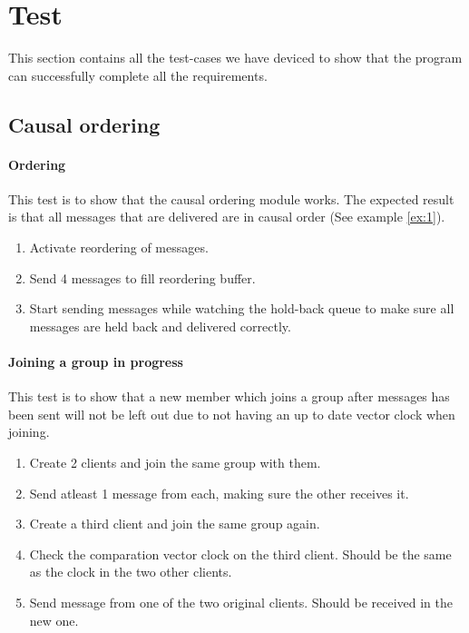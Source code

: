 \section{Test}
This section contains all the test-cases we have deviced to show that the program can successfully complete all the requirements. 

\subsection{Causal ordering}
\paragraph*{Ordering}
This test is to show that the causal ordering module works. The expected result is that all messages that are delivered are in causal order (See example \ref{ex:1}).
\begin{enumerate}
	\item Activate reordering of messages.
	\item Send 4 messages to fill reordering buffer.
	\item Start sending messages while watching the hold-back queue to make sure all messages are held back and delivered correctly. 
\end{enumerate}

\paragraph{Joining a group in progress}
This test is to show that a new member which joins a group after messages has been sent will not be left out due to not having an up to date vector clock when joining. 
\begin{enumerate}
	\item Create 2 clients and join the same group with them.
	\item Send atleast 1 message from each, making sure the other receives it. 
	\item Create a third client and join the same group again. 
	\item Check the comparation vector clock on the third client. Should be the same as the clock in the two other clients. 
	\item Send message from one of the two original clients. Should be received in the new one. 
\end{enumerate}

